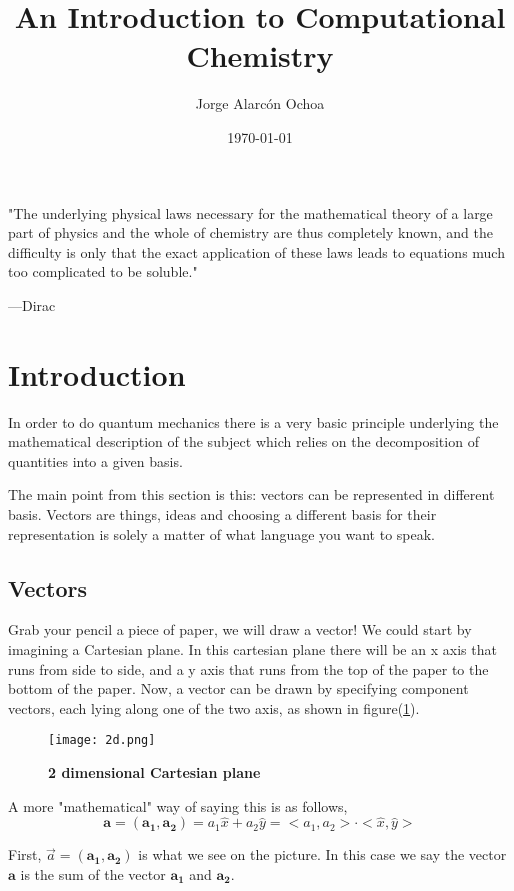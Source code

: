\documentclass[a4paper]{article}
\title{An Introduction to Computational Chemistry}
\author{Jorge Alarc\'on Ochoa}
\date{\today}
\begin{document}
\maketitle

\epigraph{"The underlying physical laws necessary for the mathematical theory of a large part of physics and the whole of chemistry are thus completely known, and the difficulty is only that the exact application of these laws leads to equations much too complicated to be soluble."}
{ ---\textup{Dirac}}


\section{Introduction}
In order to do quantum mechanics there is a very basic principle underlying the mathematical description of the subject which relies on the decomposition of quantities into a given basis.

The main point from this section is this: vectors can be represented in different basis. Vectors are things, ideas and choosing a different basis for their representation is solely a matter of what language you want to speak.

\subsection{Vectors}
Grab your pencil a piece of paper, we will draw a vector!
We could start by imagining a Cartesian plane.
In this cartesian plane there will be an x axis that runs from side to side, and a y axis that runs from the top of the paper to the bottom of the paper.
Now, a vector can be drawn by specifying component vectors, each lying along one of the two axis, as shown in figure(\ref{2d}).

\begin{figure}
	\begin{center}
	\texttt{[image: 2d.png]} \label{2d}
	\caption{\textbf{2 dimensional Cartesian plane} }
	\end{center}
\end{figure}

A more "mathematical" way of saying this is as follows,
$$
\boldsymbol{a} = \left( \boldsymbol{a_1}, \boldsymbol{a_2} \right) = a_1 \hat{x} + a_2 \hat{y} = < a_1, a_2 > \cdot < \hat{x} , \hat{y} >
$$


First, $\vec{a} = \left( \boldsymbol{a_1}, \boldsymbol{a_2} \right)$ is what we see on the picture. 
In this case we say the vector $\boldsymbol{a}$ is the sum of the vector $\boldsymbol{a_1}$ and $\boldsymbol{a_2}$.
\end{document}
